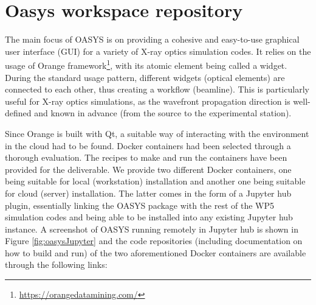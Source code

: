 \documentclass[11pt, a4paper]{article}
\begin{document}
\section{Oasys workspace repository}
\label{sec:oasys}
The main focus of OASYS is on providing a cohesive and easy-to-use graphical user interface (GUI) for a variety of X-ray optics simulation codes. It relies on the usage of Orange framework\footnote{\url{https://orangedatamining.com/}}, with its atomic element being called a widget. During the standard usage pattern, different widgets (optical elements) are connected to each other, thus creating a workflow (beamline). This is particularly useful for X-ray optics simulations, as the wavefront propagation direction is well-defined and known in advance (from the source to the experimental station).

Since Orange is built with Qt, a suitable way of interacting with the environment in the cloud had to be found. Docker containers had been selected through a thorough evaluation. The recipes to make and run the containers have been provided for the deliverable. We provide two different Docker containers, one being suitable for local (workstation) installation and another one being suitable for cloud (server) installation. The latter comes in the form of a Jupyter hub plugin, essentially linking the OASYS package with the rest of the WP5 simulation codes and being able to be installed into any existing Jupyter hub instance.  A screenshot of OASYS running remotely in Jupyter hub is shown in Figure \ref{fig:oasysJupyter} and the code repositories (including documentation on how to build and run) of the two aforementioned Docker containers are available through the following links:
\end{document}
